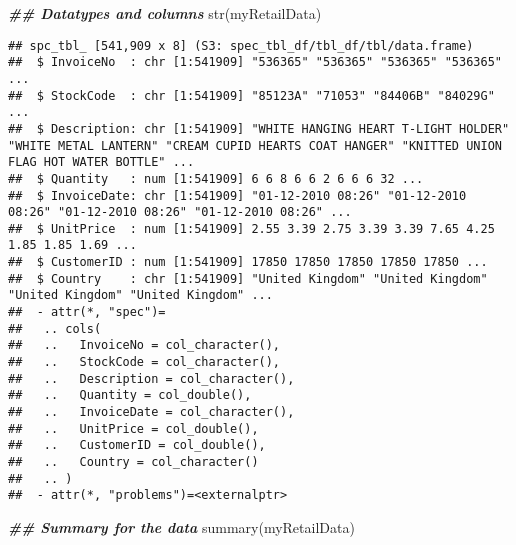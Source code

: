 \documentclass[
]{article}
\newenvironment{Shaded}{\begin{snugshade}}{\end{snugshade}}
\newcommand{\DocumentationTok}[1]{\textcolor[rgb]{0.56,0.35,0.01}{\textbf{\textit{#1}}}}
\newcommand{\FunctionTok}[1]{\textcolor[rgb]{0.00,0.00,0.00}{#1}}
\newcommand{\NormalTok}[1]{#1}
\begin{document}
\begin{Shaded}
\begin{Highlighting}[]
\DocumentationTok{\#\# Datatypes and columns}
\FunctionTok{str}\NormalTok{(myRetailData)}
\end{Highlighting}
\end{Shaded}

\begin{verbatim}
## spc_tbl_ [541,909 x 8] (S3: spec_tbl_df/tbl_df/tbl/data.frame)
##  $ InvoiceNo  : chr [1:541909] "536365" "536365" "536365" "536365" ...
##  $ StockCode  : chr [1:541909] "85123A" "71053" "84406B" "84029G" ...
##  $ Description: chr [1:541909] "WHITE HANGING HEART T-LIGHT HOLDER" "WHITE METAL LANTERN" "CREAM CUPID HEARTS COAT HANGER" "KNITTED UNION FLAG HOT WATER BOTTLE" ...
##  $ Quantity   : num [1:541909] 6 6 8 6 6 2 6 6 6 32 ...
##  $ InvoiceDate: chr [1:541909] "01-12-2010 08:26" "01-12-2010 08:26" "01-12-2010 08:26" "01-12-2010 08:26" ...
##  $ UnitPrice  : num [1:541909] 2.55 3.39 2.75 3.39 3.39 7.65 4.25 1.85 1.85 1.69 ...
##  $ CustomerID : num [1:541909] 17850 17850 17850 17850 17850 ...
##  $ Country    : chr [1:541909] "United Kingdom" "United Kingdom" "United Kingdom" "United Kingdom" ...
##  - attr(*, "spec")=
##   .. cols(
##   ..   InvoiceNo = col_character(),
##   ..   StockCode = col_character(),
##   ..   Description = col_character(),
##   ..   Quantity = col_double(),
##   ..   InvoiceDate = col_character(),
##   ..   UnitPrice = col_double(),
##   ..   CustomerID = col_double(),
##   ..   Country = col_character()
##   .. )
##  - attr(*, "problems")=<externalptr>
\end{verbatim}

\begin{Shaded}
\begin{Highlighting}[]
\DocumentationTok{\#\# Summary for the data}
\FunctionTok{summary}\NormalTok{(myRetailData)}
\end{Highlighting}
\end{Shaded}
\end{document}
